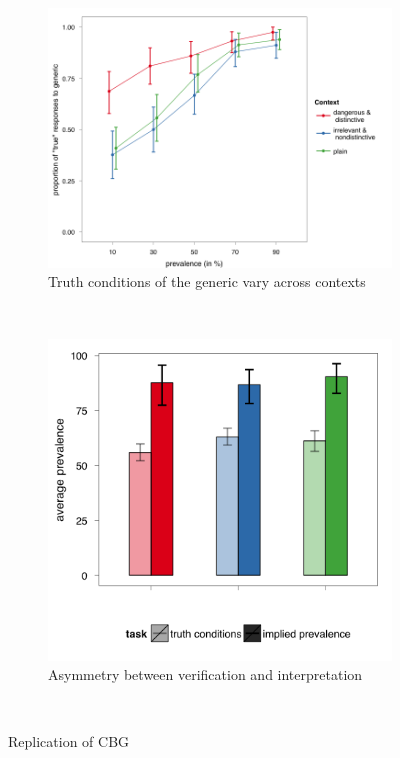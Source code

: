\documentclass[10pt,letterpaper]{article}
\begin{document}
\begin{figure}
        \centering
        \begin{subfigure}[b]{0.55\columnwidth}
                \includegraphics[width=\columnwidth]{data_truthconditions1}
                \caption{Truth conditions of the generic vary across contexts}
                \label{fig:datatc}
        \end{subfigure}%
        ~ %
        \begin{subfigure}[b]{0.45\columnwidth}
                \includegraphics[width=\columnwidth]{data_asymmetry1}
                \caption{Asymmetry between verification and interpretation}
                \label{fig:datasym}
        \end{subfigure}
        ~ %
        \caption{Replication of CBG}\label{fig:exp1}
\end{figure}
\end{document}
